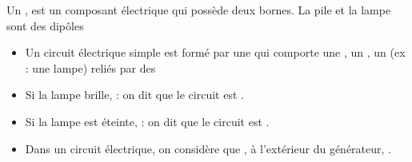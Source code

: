 \begin{mybilan}
	
	Un , est un composant électrique qui possède deux bornes. La pile et la lampe sont des dipôles
	
	\begin{itemize}
		\item Un circuit électrique simple est formé par une  qui comporte une , un , un  (ex : une lampe) reliés par des \pause
		
		\item Si la lampe brille,  : on dit que le circuit est .\pause
		
		\item Si la lampe est éteinte,  : on dit que le circuit est .\pause
		
		\item Dans un circuit électrique, on considère que , à l'extérieur du générateur, .
	\end{itemize}



\end{mybilan}